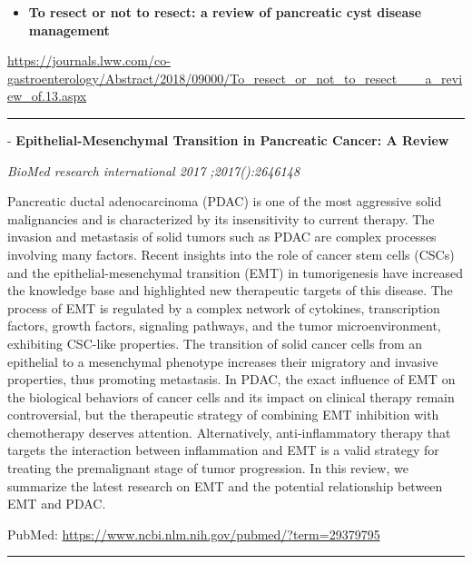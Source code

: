\documentclass[]{article}
\providecommand{\tightlist}{%
  \setlength{\itemsep}{0pt}\setlength{\parskip}{0pt}}
\begin{document}
\begin{itemize}
\tightlist
\item
  \textbf{To resect or not to resect: a review of pancreatic cyst
  disease management}
\end{itemize}

\url{https://journals.lww.com/co-gastroenterology/Abstract/2018/09000/To_resect_or_not_to_resect___a_review_of.13.aspx}

\begin{center}\rule{0.5\linewidth}{\linethickness}\end{center}

 - \textbf{Epithelial-Mesenchymal Transition in Pancreatic Cancer: A
Review}

\emph{BioMed research international 2017 ;2017():2646148}

Pancreatic ductal adenocarcinoma (PDAC) is one of the most aggressive
solid malignancies and is characterized by its insensitivity to current
therapy. The invasion and metastasis of solid tumors such as PDAC are
complex processes involving many factors. Recent insights into the role
of cancer stem cells (CSCs) and the epithelial-mesenchymal transition
(EMT) in tumorigenesis have increased the knowledge base and highlighted
new therapeutic targets of this disease. The process of EMT is regulated
by a complex network of cytokines, transcription factors, growth
factors, signaling pathways, and the tumor microenvironment, exhibiting
CSC-like properties. The transition of solid cancer cells from an
epithelial to a mesenchymal phenotype increases their migratory and
invasive properties, thus promoting metastasis. In PDAC, the exact
influence of EMT on the biological behaviors of cancer cells and its
impact on clinical therapy remain controversial, but the therapeutic
strategy of combining EMT inhibition with chemotherapy deserves
attention. Alternatively, anti-inflammatory therapy that targets the
interaction between inflammation and EMT is a valid strategy for
treating the premalignant stage of tumor progression. In this review, we
summarize the latest research on EMT and the potential relationship
between EMT and PDAC.

PubMed: \url{https://www.ncbi.nlm.nih.gov/pubmed/?term=29379795}

{}

{}

\begin{center}\rule{0.5\linewidth}{\linethickness}\end{center}
\end{document}
